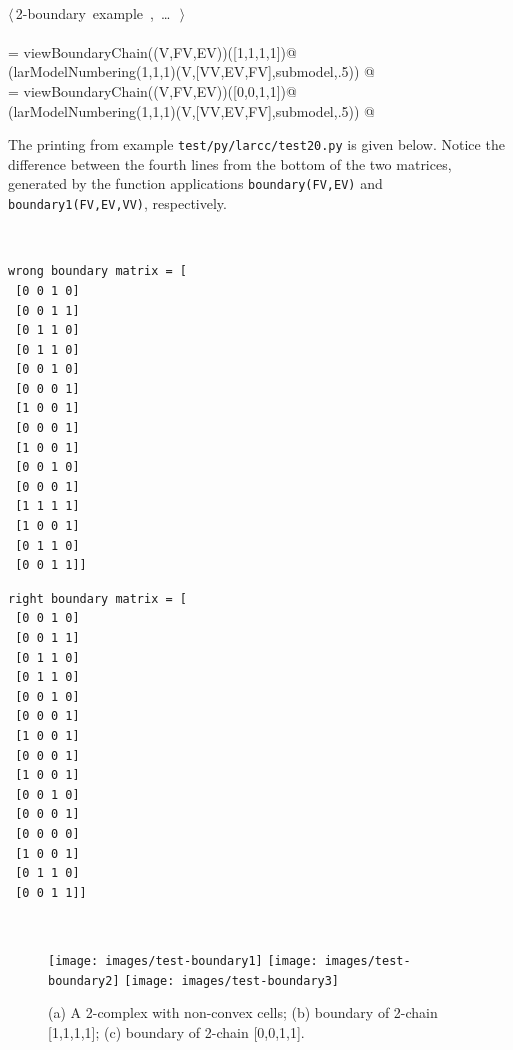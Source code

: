 \documentclass[11pt,oneside]{article}	%
\begin{document}
\begin{flushleft}
\begin{list}{}{}
\mbox{}\verb@@\\
\mbox{}\verb@@\hbox{$\langle\,$2-boundary example\nobreak\ {\footnotesize {}, \ldots\ }$\,\rangle$}\verb@@\\
\mbox{}\verb@@\\
\mbox{}\verb@submodel = viewBoundaryChain((V,FV,EV))([1,1,1,1])@\\
\mbox{}\verb@VIEW(larModelNumbering(1,1,1)(V,[VV,EV,FV],submodel,.5)) @\\
\mbox{}\verb@submodel = viewBoundaryChain((V,FV,EV))([0,0,1,1])@\\
\mbox{}\verb@VIEW(larModelNumbering(1,1,1)(V,[VV,EV,FV],submodel,.5)) @\\
\mbox{}\verb@@{\NWsep}
\end{list}
\vspace{-2ex}
\end{flushleft}

The printing from example \texttt{test/py/larcc/test20.py} is given below. Notice the difference between the fourth lines from the bottom of the two matrices, generated by the function applications \texttt{boundary(FV,EV)} and \texttt{boundary1(FV,EV,VV)}, respectively.

\vspace{2mm}
~\hfill
\begin{minipage}[c]{0.35\textwidth}
\centering\footnotesize
\begin{verbatim}
wrong boundary matrix = [
 [0 0 1 0]
 [0 0 1 1]
 [0 1 1 0]
 [0 1 1 0]
 [0 0 1 0]
 [0 0 0 1]
 [1 0 0 1]
 [0 0 0 1]
 [1 0 0 1]
 [0 0 1 0]
 [0 0 0 1]
 [1 1 1 1]
 [1 0 0 1]
 [0 1 1 0]
 [0 0 1 1]]
\end{verbatim}
\end{minipage}
\hfill
\begin{minipage}[c]{0.35\textwidth}
\centering\footnotesize
\begin{verbatim}
right boundary matrix = [
 [0 0 1 0]
 [0 0 1 1]
 [0 1 1 0]
 [0 1 1 0]
 [0 0 1 0]
 [0 0 0 1]
 [1 0 0 1]
 [0 0 0 1]
 [1 0 0 1]
 [0 0 1 0]
 [0 0 0 1]
 [0 0 0 0]
 [1 0 0 1]
 [0 1 1 0]
 [0 0 1 1]]
\end{verbatim}
\end{minipage}
\hfill~


\begin{figure}[htbp] %
   \centering
   \texttt{[image: images/test-boundary1]} 
   \texttt{[image: images/test-boundary2]} 
   \texttt{[image: images/test-boundary3]} 
   \caption{(a) A 2-complex with non-convex cells; (b) boundary of 2-chain [1,1,1,1]; (c) boundary of 2-chain [0,0,1,1].}
   \label{fig:example}
\end{figure}
\end{document}
